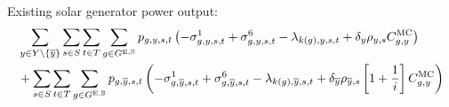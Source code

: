 \documentclass{article}
\begin{document}
Existing solar generator power output:
\begin{align}
	& \sum\limits_{\iYear \in \sYears 
		\setminus \{\iYearTerminal\}
	}\sum\limits_{\iScenario \in \sScenarios}\sum\limits_{\iInterval \in \sIntervals} \sum\limits_{\iGenerator \in \sGeneratorsExistingSolar} \vPower\left(-\dMinPowerOutput + \dMaxPowerOutputSolarExisting 
	- \dPowerBalance[k(\iGenerator),\iYear,\iScenario,\iInterval] + \cDiscountRate \cScenarioDuration\cMarginalCost
	\right) \nonumber\\
	& + \sum\limits_{\iScenario \in \sScenarios} \sum\limits_{\iInterval \in \sIntervals} \sum\limits_{\iGenerator \in \sGeneratorsExistingSolar} \vPower[\iGenerator,\iYearTerminal,\iScenario,\iInterval] \left(-\dMinPowerOutput[\iGenerator,\iYearTerminal,\iScenario,\iInterval] + \dMaxPowerOutputSolarExisting[\iGenerator,\iYearTerminal,\iScenario,\iInterval] - \dPowerBalance[k(\iGenerator),\iYearTerminal,\iScenario,\iInterval] + \cDiscountRate[\iYearTerminal] \cScenarioDuration[\iYearTerminal,\iScenario] \left[1 + \frac{1}{\cInterestRate}\right] \cMarginalCost \right)\\
\end{align}
\end{document}

